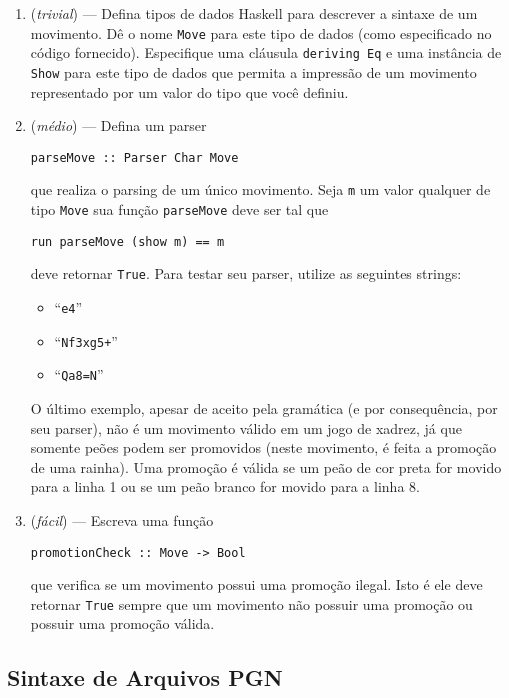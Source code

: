 \documentclass[11pt,a4paper]{article}
\begin{document}
\begin{enumerate}
	\item (\emph{trivial}) --- Defina tipos de dados Haskell para descrever a sintaxe de um movimento. D\^e o nome
	      \texttt{Move} para este tipo de dados (como especificado no c\'odigo fornecido).
	      Especifique uma cl\'ausula \texttt{deriving Eq} e uma inst\^ancia de \texttt{Show}
	      para este tipo de dados que permita a impress\~ao de um movimento representado por um
	      valor do tipo que voc\^e definiu.
	\item (\emph{m\'edio}) --- Defina um parser
	\begin{center}
		\texttt{parseMove :: Parser Char Move}
	\end{center}
	que realiza o parsing de um \'unico movimento. Seja \texttt{m} um valor qualquer de tipo
	\texttt{Move} sua fun\c{c}\~ao \texttt{parseMove} deve ser tal que
	\begin{center}
		\texttt{run parseMove (show m) == m}
	\end{center}
	deve retornar \texttt{True}. Para testar seu parser, utilize as seguintes strings:
	\begin{itemize}
		\item ``\texttt{e4}''
		\item ``\texttt{Nf3xg5+}''
		\item ``\texttt{Qa8=N}''
	\end{itemize}
	O \'ultimo exemplo, apesar de aceito pela gram\'atica (e por consequ\^encia, por seu parser), n\~ao \'e
	um movimento v\'alido em um jogo de xadrez, j\'a que somente pe\~oes podem ser promovidos (neste movimento,
	\'e feita a promo\c{c}\~ao de uma rainha). Uma promo\c{c}\~ao \'e v\'alida se um pe\~ao de cor preta for 
	movido para a linha 1 ou se um pe\~ao branco for movido para a linha 8.
	\item (\emph{f\'acil}) --- Escreva uma fun\c{c}\~ao
	\begin{center}
		\texttt{promotionCheck :: Move -> Bool}
	\end{center}
	que verifica se um movimento possui uma promo\c{c}\~ao ilegal. Isto \'e ele deve retornar \texttt{True} sempre
	que um movimento n\~ao possuir uma promo\c{c}\~ao ou possuir uma promo\c{c}\~ao v\'alida.
\end{enumerate}

\subsection{Sintaxe de Arquivos PGN}
\end{document}
